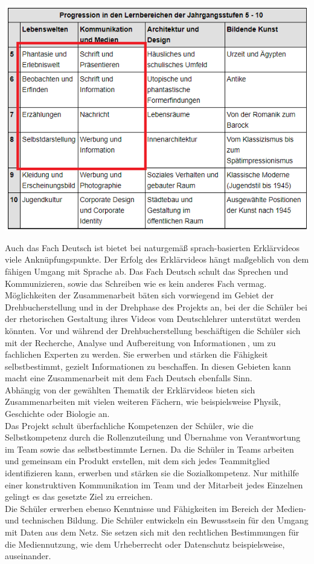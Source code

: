 \documentclass[a4paper,12pt,twoside=false]{scrartcl}
\begin{document}
\begin{center}
	\includegraphics[scale = 0.3]{KunstFachprofil.png} 
\end{center}
Auch das Fach Deutsch ist bietet bei naturgemäß sprach-basierten Erklärvideos viele Anknüpfungspunkte. Der Erfolg des Erklärvideos hängt maßgeblich von dem fähigen Umgang mit Sprache ab. Das Fach Deutsch schult das Sprechen und Kommunizieren, sowie das Schreiben wie es kein anderes Fach vermag. Möglichkeiten der Zusammenarbeit bäten sich vorwiegend im Gebiet der Drehbucherstellung und in der Drehphase des Projekts an, bei der die Schüler bei der rhetorischen Gestaltung ihres Videos vom Deutschlehrer unterstützt werden könnten. Vor und während der Drehbucherstellung beschäftigen die Schüler sich mit der \glqq Recherche, Analyse und Aufbereitung von Informationen\grqq $~$, um zu fachlichen Experten zu werden. Sie erwerben und stärken die Fähigkeit selbstbestimmt, gezielt Informationen zu beschaffen. In diesen Gebieten kann macht eine Zusammenarbeit mit dem Fach Deutsch ebenfalls Sinn.  \\
Abhängig von der gewählten Thematik der Erklärvideos bieten sich Zusammenarbeiten mit vielen weiteren Fächern, wie beispielsweise Physik, Geschichte oder Biologie an. \\ 
Das Projekt schult überfachliche Kompetenzen der Schüler, wie die Selbstkompetenz durch die Rollenzuteilung und Übernahme von Verantwortung im Team sowie das selbstbestimmte Lernen. Da die Schüler in Teams arbeiten und gemeinsam ein Produkt erstellen, mit dem sich jedes Teammitglied identifizieren kann, erwerben und stärken sie die Sozialkompetenz. Nur mithilfe einer konstruktiven Kommunikation im Team und der Mitarbeit jedes Einzelnen gelingt es das gesetzte Ziel zu erreichen. \\
Die Schüler erwerben ebenso Kenntnisse und Fähigkeiten im Bereich der Medien- und technischen Bildung. Die Schüler entwickeln ein Bewusstsein für den Umgang mit Daten aus dem Netz. Sie setzen sich mit den rechtlichen Bestimmungen für die Mediennutzung, wie dem Urheberrecht oder Datenschutz beispielsweise, auseinander. 
\end{document}
